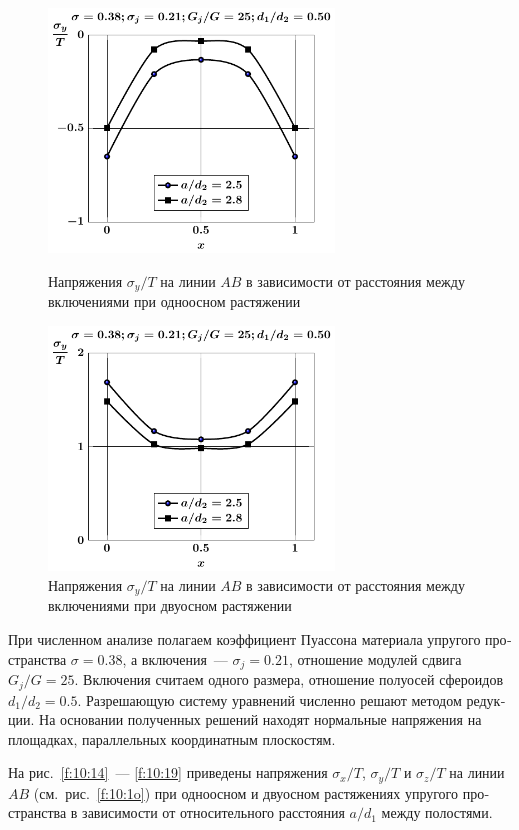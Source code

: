 \begin{russian}
\begin{figure}[h!]
\centering\footnotesize
\parbox[b]{7.5cm}{\centering\includegraphics[width=7.6cm]{oblate-inc8-a-d50-g25-t1-sig_y.pdf}
\caption{Напряжения $\sigma_y/T$ на линии $AB$ в зависимости от расстояния между включениями при одноосном растяжении
\label{f:10:16}}}\hfil\hfil
\parbox[b]{7.5cm}{\centering\includegraphics[width=7.6cm]{oblate-inc8-a-d50-g25-t2-sig_y.pdf}
\caption{Напряжения $\sigma_y/T$ на линии $AB$ в зависимости от расстояния между включениями при двуосном растяжении
\label{f:10:17}}}
\end{figure}

При численном анализе полагаем коэффициент Пуассона материала упругого пространства $\sigma=0.38$, а включения~--- $\sigma_j=0.21$, отношение модулей сдвига $G_j/G=25$. Включения считаем одного размера, отношение полуосей сфероидов $d_1/d_2=0.5$. Разрешающую систему уравнений численно решают методом редукции. На основании полученных решений находят нормальные напряжения на площадках, параллельных координатным плоскостям.

На рис.~\ref{f:10:14}~--- \ref{f:10:19} приведены напряжения $\sigma_x/T$, $\sigma_y/T$ и $\sigma_z/T$ на линии $AB$ (см.~рис.~\ref{f:10:1o}) при одноосном и двуосном растяжениях упругого пространства в зависимости от относительного расстояния $a/d_1$ между полостями.


\end{russian}
